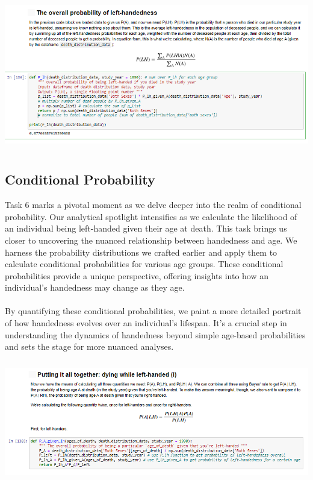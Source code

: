 \documentclass{article}
\begin{document}
\vspace{1cm}
        \begin{center}
            \includegraphics[height=190pt]{5.png}\\
        \end{center}
        
\newpage
\subsection{Conditional Probability}
Task 6 marks a pivotal moment as we delve deeper into the realm of conditional probability. Our analytical spotlight intensifies as we calculate the likelihood of an individual being left-handed given their age at death. This task brings us closer to uncovering the nuanced relationship between handedness and age. We harness the probability distributions we crafted earlier and apply them to calculate conditional probabilities for various age groups. These conditional probabilities provide a unique perspective, offering insights into how an individual's handedness may change as they age.\\ \\By quantifying these conditional probabilities, we paint a more detailed portrait of how handedness evolves over an individual's lifespan. It's a crucial step in understanding the dynamics of handedness beyond simple age-based probabilities and sets the stage for more nuanced analyses.

\vspace{2cm}
        \begin{center}
            \includegraphics[height=150pt]{6.png}
        \end{center}
\vspace{0.5cm}
\end{document}
